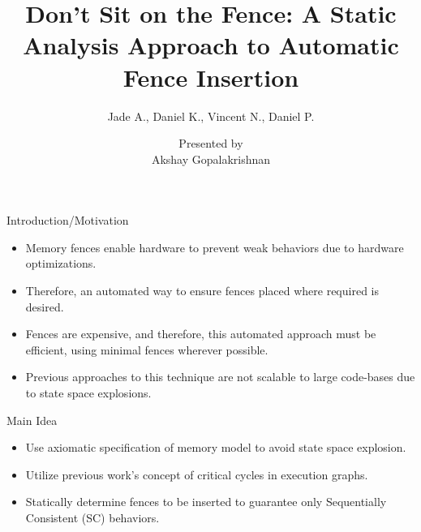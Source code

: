 \documentclass[notes, xcolor=dvipsnames]{beamer}
\title{Don't Sit on the Fence: A Static Analysis Approach to Automatic Fence Insertion}
\subtitle{Jade A., Daniel K., Vincent N., Daniel P.}
\author{Presented by \\ Akshay Gopalakrishnan}
\begin{document}
    \begin{frame}

        \maketitle

    \end{frame}

    \begin{frame}{Introduction/Motivation}

        \begin{itemize}
            \item Memory fences enable hardware to prevent weak behaviors due to hardware optimizations.
            \item Therefore, an automated way to ensure fences placed where required is desired.
            \item Fences are expensive, and therefore, this automated approach must be efficient, using minimal fences wherever possible.
            \item Previous approaches to this technique are not scalable to large code-bases due to state space explosions.
        \end{itemize}

    \end{frame}



    \begin{frame}{Main Idea}
        
        \begin{itemize}
            \item Use axiomatic specification of memory model to avoid state space explosion. 
            \item Utilize previous work's concept of critical cycles in execution graphs.
            \item Statically determine fences to be inserted to guarantee only Sequentially Consistent (SC) behaviors.  
        \end{itemize}

    \end{frame}
\end{document}
